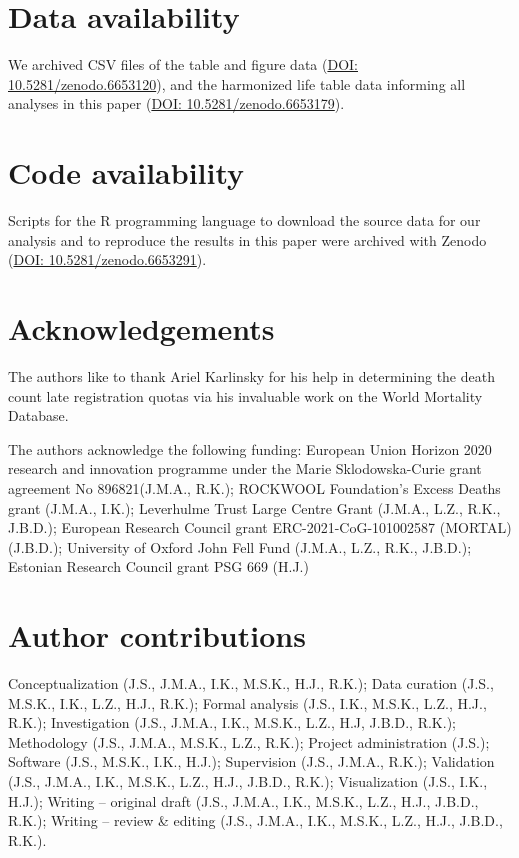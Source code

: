 \documentclass[12pt]{article}
\begin{document}
\clearpage

\section*{Data availability}

We archived CSV files of the table and figure data (\href{https://zenodo.org/record/6653120}{DOI: 10.5281/zenodo.6653120}), and the harmonized life table data informing all analyses in this paper (\href{https://zenodo.org/record/6653179}{DOI: 10.5281/zenodo.6653179}).

\section*{Code availability}

Scripts for the R programming language to download the source data for our analysis and to reproduce the results in this paper were archived with Zenodo (\href{https://zenodo.org/record/6653291}{DOI:  10.5281/zenodo.6653291}).

\clearpage


\clearpage
\appendix

\section*{Acknowledgements}

The authors like to thank Ariel Karlinsky for his help in determining the death count late registration quotas via his invaluable work on the World Mortality Database.

The authors acknowledge the following funding: European Union Horizon 2020 research and innovation programme under the Marie Sklodowska-Curie grant agreement No 896821(J.M.A., R.K.); ROCKWOOL Foundation's Excess Deaths grant (J.M.A., I.K.); Leverhulme Trust Large Centre Grant (J.M.A., L.Z., R.K., J.B.D.); European Research Council grant ERC-2021-CoG-101002587 (MORTAL) (J.B.D.); University of Oxford John Fell Fund (J.M.A., L.Z., R.K., J.B.D.); Estonian Research Council grant PSG 669 (H.J.)

\section*{Author contributions}

Conceptualization (J.S., J.M.A., I.K., M.S.K., H.J., R.K.); Data curation (J.S., M.S.K., I.K., L.Z., H.J., R.K.); Formal analysis (J.S., I.K., M.S.K., L.Z., H.J., R.K.); Investigation (J.S., J.M.A., I.K., M.S.K., L.Z., H.J, J.B.D., R.K.); Methodology (J.S., J.M.A., M.S.K., L.Z., R.K.); Project administration (J.S.); Software (J.S., M.S.K., I.K., H.J.); Supervision (J.S., J.M.A., R.K.); Validation (J.S., J.M.A., I.K., M.S.K., L.Z., H.J., J.B.D., R.K.); Visualization (J.S., I.K., H.J.); Writing -- original draft (J.S., J.M.A., I.K., M.S.K., L.Z., H.J., J.B.D., R.K.); Writing -- review  \& editing (J.S., J.M.A., I.K., M.S.K., L.Z., H.J., J.B.D., R.K.).
\end{document}
